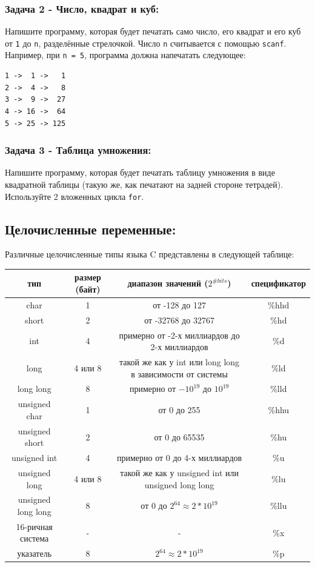 \documentclass{article}
\begin{document}
\subsubsection*{Задача 2 - Число, квадрат и куб:} 
Напишите программу, которая будет печатать само число, его квадрат и его куб от \texttt{1} до \texttt{n}, разделённые стрелочкой.
Число \texttt{n} считывается с помощью \texttt{scanf}. 
Например, при \texttt{n = 5}, программа должна напечатать следующее:
\begin{verbatim}
1 ->  1 ->   1
2 ->  4 ->   8
3 ->  9 ->  27
4 -> 16 ->  64
5 -> 25 -> 125
\end{verbatim}

\subsubsection*{Задача 3 - Таблица умножения:} 
Напишите программу, которая будет печатать таблицу умножения в виде квадратной таблицы (такую же, как печатают на задней стороне тетрадей). Используйте 2 вложенных цикла \texttt{for}.

\subsection*{Целочисленные переменные:} Различные целочисленные типы языка C представлены в следующей таблице:

\begin{center}
\begin{tabular}{ c c c c }
 тип & размер (байт) & диапазон значений ($2^{\# bits}$) & спецификатор \\ \hline
 char & 1 & от -128 до 127 & \%hhd \\ 
 short & 2 & от -32768 до 32767 & \%hd  \\  
 int & 4 & примерно от -2-х миллиардов до 2-х миллиардов & \%d  \\  
 long & 4 или 8 & такой же как у int или long long в зависимости от системы & \%ld  \\  
 long long & 8 & примерно от $-10^{19}$ до $10^{19}$ & \%lld  \\  
 unsigned char & 1 & от 0 до 255 & \%hhu \\ 
 unsigned short & 2 & от 0 до 65535 & \%hu  \\  
 unsigned int & 4 & примерно от 0 до 4-х миллиардов & \%u  \\  
 unsigned long & 4 или 8 & такой же как у unsigned int или unsigned long long & \%lu  \\  
 unsigned long long & 8 & от 0 до $2^{64} \approx 2*10^{19}$  & \%llu  \\  
 16-ричная система & - & - & \%x  \\ 
 указатель & 8 & $2^{64} \approx 2*10^{19}$ & \%p  \\  
\end{tabular}
\end{center}
\end{document}
